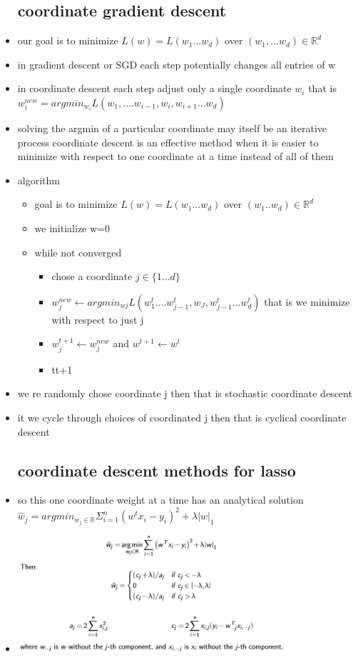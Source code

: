 \documentclass{article}
\begin{document}
\begin{itemize}
\subsection{coordinate gradient descent}
\item our goal is to minimize $L(w)=L(w_1...w_d)$ over $(w_1,...w_d)\in \mathbb{R}^{d} $
\item in gradient descent or SGD each step potentially changes all entries of w
\item in coordinate descent each step adjust only a single coordinate $w_i$ that is $w_i^{new}=argmin_{w_i}L(w_1,....w_{i-1},w_{i},w_{i+1}...w_{d})$
\item solving the argmin of a particular coordinate may itself be an iterative process 
\tiem coordinate descent is an effective method when it is easier to minimize with respect to one coordinate at a time instead of all of them 
\item algorithm 
\begin{itemize}
    \item goal is to minimize $L(w)=L(w_1...w_d)$ over $(w_1..w_d)\in\mathbb{R}^{d}$
    \item we initialize w=0
    \item while not converged
    \begin{itemize}
        \item chose a coordinate $j\in \{1...d\}$
        \item $w_{j}^{new}\leftarrow argmin_{wj}L(w_1^{t}....w_{j-1}^{t}, w_{J} , w_{j-1}^{t}...w_{d}^{t})$ that is we minimize with respect to just j
        \item $w_{j}^{t+1}\leftarrow w_{j}^{new}$ and $w^{t+1}\leftarrow w^{t}$
        \item t\leftarrow t+1
    \end{itemize}
\end{itemize}
\item we re randomly chose coordinate j then that is stochastic coordinate descent 
\item it we cycle through choices of coordinated j then that is cyclical coordinate descent 

\subsection{coordinate descent methods for lasso}
\item so this one coordinate  weight at a time has an analytical solution $\hat{w}_{j}=argmin_{w_{j}\in \mathbb{R}}\Sigma_{i=1}^{n}(w^{t}x_i-y_i)^2+\lambda |w|_{1}$ 
\item \includegraphics[width =10cm]{lecture_notes/lecture_3/immages/l3_11.jpg}

\end{itemize}
\end{document}
